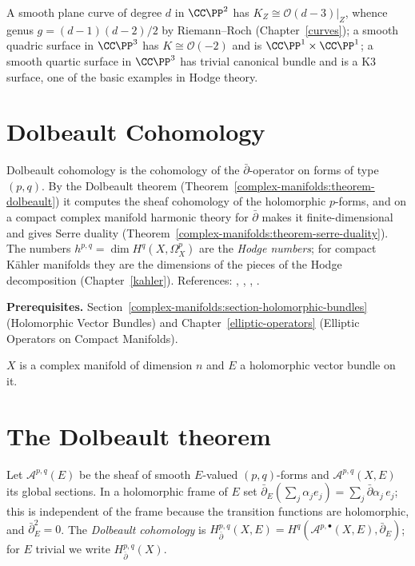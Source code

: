\begin{example}\label{complex-manifolds:example-adjunction}
A smooth plane curve of degree $d$ in $\CC\PP^2$ has $K_Z \cong \mathcal{O}(d - 3)|_Z$, whence genus $g = (d-1)(d-2)/2$ by Riemann--Roch (Chapter~\ref{curves}); a smooth quadric surface in $\CC\PP^3$ has
$K \cong \mathcal{O}(-2)$ and is $\CC\PP^1 \times \CC\PP^1$; a smooth quartic surface in $\CC\PP^3$ has trivial canonical bundle and is a K3 surface, one of the basic examples in Hodge theory.
\end{example}

\section{Dolbeault Cohomology}\label{complex-manifolds:section-dolbeault}
Dolbeault cohomology is the cohomology of the $\bar\partial$-operator on forms of type $(p,q)$. By the Dolbeault theorem
(Theorem~\ref{complex-manifolds:theorem-dolbeault}) it computes the sheaf cohomology of the holomorphic $p$-forms, and on a compact complex
manifold harmonic theory for $\bar\partial$ makes it finite-dimensional and gives Serre duality
(Theorem~\ref{complex-manifolds:theorem-serre-duality}). The numbers $h^{p,q} = \dim H^q(X, \Omega^p_X)$ are the \emph{Hodge numbers}; for
compact K\"ahler manifolds they are the dimensions of the pieces of the Hodge decomposition (Chapter~\ref{kahler}).
References: \cite[Chapter 0]{griffiths-harris}, \cite[Chapter 4]{voisin-hodge-1}, \cite[Chapters 2--4]{huybrechts-complex},
\cite{wells-differential-analysis}.

\noindent\textbf{Prerequisites.} Section~\ref{complex-manifolds:section-holomorphic-bundles} (Holomorphic Vector Bundles) and Chapter~\ref{elliptic-operators}
(Elliptic Operators on Compact Manifolds).

$X$ is a complex manifold of dimension $n$ and $E$ a holomorphic vector bundle on it.

\section{The Dolbeault theorem}\label{complex-manifolds:section-dolbeault-theorem}

\begin{definition}\label{complex-manifolds:definition-dolbeault}
Let $\mathcal{A}^{p,q}(E)$ be the sheaf of smooth $E$-valued $(p,q)$-forms and $\mathcal{A}^{p,q}(X, E)$ its global sections. In a holomorphic frame of $E$ set $\bar\partial_E(\sum_j\alpha_j e_j) = \sum_j\bar\partial\alpha_j\,e_j$;
this is independent of the frame because the transition functions are holomorphic, and $\bar\partial_E^2 = 0$. The \emph{Dolbeault cohomology} is
$H^{p,q}_{\bar\partial}(X, E) = H^q(\mathcal{A}^{p,\bullet}(X, E), \bar\partial_E)$; for $E$ trivial we write $H^{p,q}_{\bar\partial}(X)$.
\end{definition}

